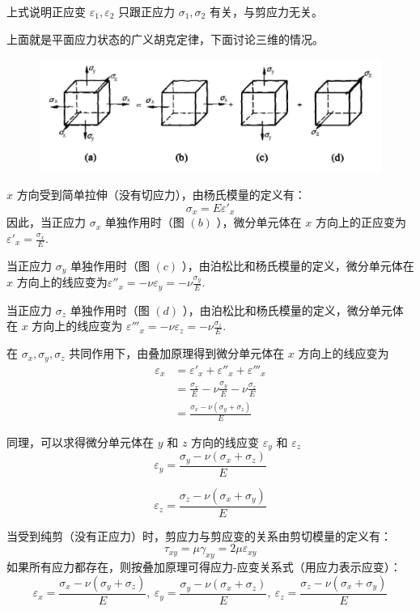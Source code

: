 \documentclass[12pt,a4paper]{article}
\begin{document}
上式说明正应变 $\varepsilon_1,\varepsilon_2$ 只跟正应力 $\sigma_1,\sigma_2$ 有关，与剪应力无关。

上面就是平面应力状态的广义胡克定律，下面讨论三维的情况。

\begin{figure}[H]
\centering
\includegraphics[scale=0.5]{./figures/16.png}
\caption{}
\end{figure}

$x$ 方向受到简单拉伸（没有切应力），由杨氏模量的定义有：
$$
\sigma_x=E\varepsilon'_{x}
$$
因此，当正应力 $\sigma_x$ 单独作用时（图 $(b)$ ），微分单元体在 $x$ 方向上的正应变为
$\varepsilon'_{x}=\frac{\sigma_x}{E}$.

当正应力 $\sigma_y$ 单独作用时（图 $(c)$ ），由泊松比和杨氏模量的定义，微分单元体在 $x$ 方向上的线应变为$\varepsilon''_{x}=-\nu\varepsilon_y=-\nu\frac{\sigma_y}{E}$.

当正应力 $\sigma_z$ 单独作用时（图 $(d)$ ），由泊松比和杨氏模量的定义，微分单元体在 $x$ 方向上的线应变为 $\varepsilon'''_{x}=-\nu\varepsilon_z=-\nu\frac{\sigma_z}{E}$.

在 $\sigma_x,\sigma_y,\sigma_z$ 共同作用下，由叠加原理得到微分单元体在 $x$ 方向上的线应变为
\begin{align*}
\varepsilon_x & =\varepsilon'_{x}+\varepsilon''_{x}+\varepsilon'''_{x} \\
& =\frac{\sigma_x}{E}-\nu\frac{\sigma_y}{E}-\nu\frac{\sigma_z}{E} \\
& =\frac{\sigma_x-\nu(\sigma_y+\sigma_z)}{E}
\end{align*}

同理，可以求得微分单元体在 $y$ 和 $z$ 方向的线应变 $\varepsilon_y$ 和 $\varepsilon_z$
$$
\varepsilon_y=\frac{\sigma_y-\nu(\sigma_x+\sigma_z)}{E}
$$

$$
\varepsilon_z=\frac{\sigma_z-\nu(\sigma_x+\sigma_y)}{E}
$$

当受到纯剪（没有正应力）时，剪应力与剪应变的关系由剪切模量的定义有：
$$
\tau_{xy}=\mu\gamma_{xy}=2\mu\varepsilon_{xy}
$$
如果所有应力都存在，则按叠加原理可得应力-应变关系式（用应力表示应变）：
$$
\varepsilon_x=\frac{\sigma_x-\nu(\sigma_y+\sigma_z)}{E}, ~ \varepsilon_y=\frac{\sigma_y-\nu(\sigma_x+\sigma_z)}{E}, ~ \varepsilon_z=\frac{\sigma_z-\nu(\sigma_x+\sigma_y)}{E}
$$
\end{document}
